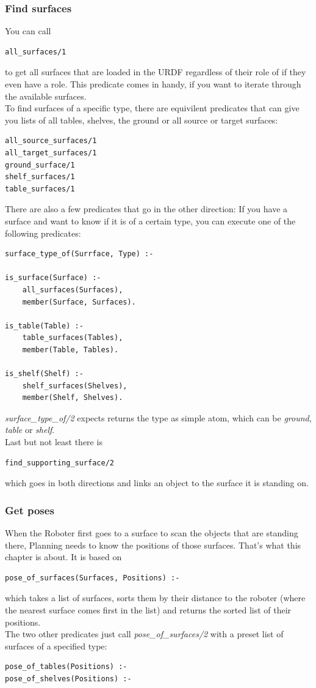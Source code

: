 \documentclass[main.tex]{subfiles}
\begin{document}
\subsubsection{Find surfaces}

You can call
\begin{lstlisting}
all_surfaces/1
\end{lstlisting}
to get all surfaces that are loaded in the URDF regardless of their role of if they even have a role. This predicate comes in handy, if you want to iterate through the available surfaces.\\
To find surfaces of a specific type, there are equivilent predicates that can give you lists of all tables, shelves, the ground or all source or target surfaces:
\begin{lstlisting}
all_source_surfaces/1
all_target_surfaces/1
ground_surface/1
shelf_surfaces/1
table_surfaces/1
\end{lstlisting}

There are also a few predicates that go in the other direction: If you have a surface and want to know if it is of a certain type, you can execute one of the following predicates:
\begin{lstlisting}
surface_type_of(Surrface, Type) :-

is_surface(Surface) :-
    all_surfaces(Surfaces),
    member(Surface, Surfaces).

is_table(Table) :-
    table_surfaces(Tables),
    member(Table, Tables).

is_shelf(Shelf) :-
    shelf_surfaces(Shelves),
    member(Shelf, Shelves).
\end{lstlisting}
\textit{surface\_type\_of/2} expects returns the type as simple atom, which can be \textit{ground}, \textit{table} or \textit{shelf}.\\
Last but not least there is 
\begin{lstlisting}
find_supporting_surface/2
\end{lstlisting}
which goes in both directions and links an object to the surface it is standing on.

\subsubsection{Get poses}
When the Roboter first goes to a surface to scan the objects that are standing there, Planning needs to know the positions of those surfaces. That's what this chapter is about. It is based on
\begin{lstlisting}
pose_of_surfaces(Surfaces, Positions) :-
\end{lstlisting}
which takes a list of surfaces, sorts them by their distance to the roboter (where the nearest surface comes first in the list) and returns the sorted list of their positions.\\
The two other predicates just call \textit{pose\_of\_surfaces/2} with a preset list of surfaces of a specified type:
\begin{lstlisting}
pose_of_tables(Positions) :-
pose_of_shelves(Positions) :-
\end{lstlisting}
\end{document}
